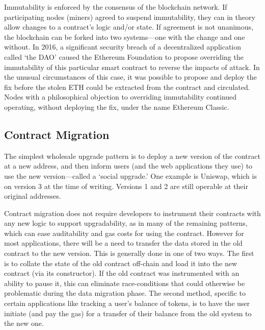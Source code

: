 Immutability is enforced by the consensus of the blockchain network. If participating nodes (\eg miners) agreed to suspend immutability, they can in theory allow changes to a contract's logic and/or state. If agreement is not unanimous, the blockchain can be forked into two systems---one with the change and one without. In 2016, a significant security breach of a decentralized application called `the DAO' caused the Ethereum Foundation to propose overriding the immutability of this particular smart contract to reverse the impacts of attack. In the unusual circumstances of this case, it was possible to propose and deploy the fix before the stolen ETH could be extracted from the contract and circulated. Nodes with a philosophical objection to overriding immutability continued operating, without deploying the fix, under the name Ethereum Classic.



\subsection{Contract Migration}
\label{sec:migration}

The simplest wholesale upgrade pattern is to deploy a new version of the contract at a new address, and then inform users (and the web applications they use) to use the new version---called a `social upgrade.' One example is Uniswap, which is on version 3 at the time of writing. Versions 1 and 2 are still operable at their original addresses. 

Contract migration does not require developers to instrument their contracts with any new logic to support upgradability, as in many of the remaining patterns, which can ease auditability and gas costs for using the contract. However for most applications, there will be a need to transfer the data stored in the old contract to the new version. This is generally done in one of two ways. The first is to collate the state of the old contract off-chain and load it into the new contract (\eg via its constructor). If the old contract was instrumented with an ability to pause it, this can eliminate race-conditions that could otherwise be problematic during the data migration phase. The second method, specific to certain applications like tracking a user's balance of tokens, is to have the user initiate (and pay the gas) for a transfer of their balance from the old system to the new one.
 
